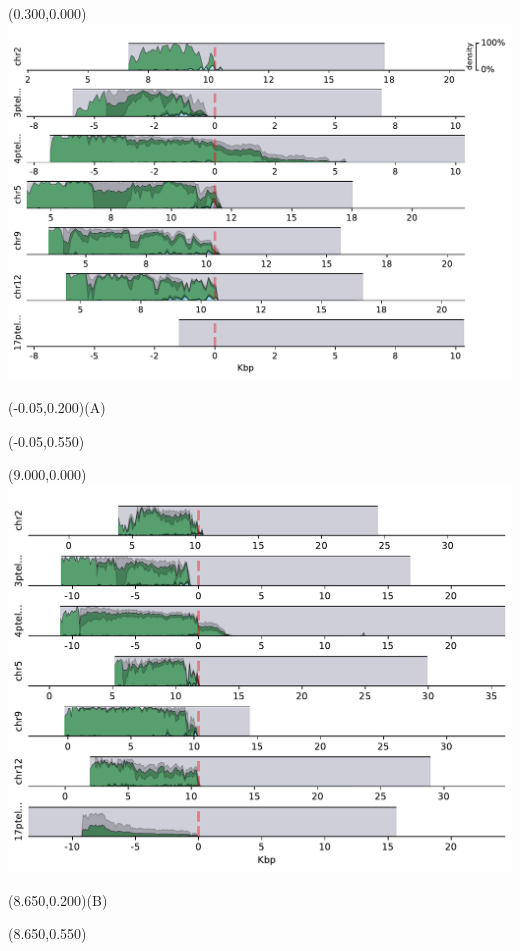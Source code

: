 \documentclass{article}
\begin{document}
\begin{textblock}{13}(0.300,0.000)\includegraphics{Figure_S2/HG001/densityplot-p_arm.pdf}\end{textblock}
\begin{textblock}{13}(-0.05,0.200)\LARGE{(A)}\end{textblock}
\begin{textblock}{13}(-0.05,0.550)\end{textblock}

\begin{textblock}{13}(9.000,0.000)\includegraphics{Figure_S2/HG003/densityplot-p_arm.pdf}\end{textblock}
\begin{textblock}{13}(8.650,0.200)\LARGE{(B)}\end{textblock}
\begin{textblock}{13}(8.650,0.550)\end{textblock}
\end{document}
